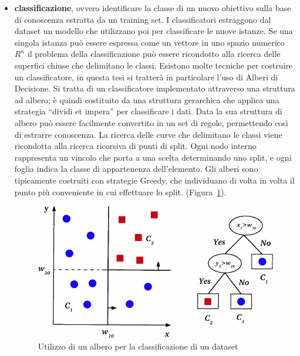\begin{itemize}
\item \textbf{classificazione}, ovvero identificare la classe di un nuovo obiettivo sulla base di conoscenza estratta da un training set. I classificatori estraggono dal dataset un modello che utilizzano poi per classificare le nuove istanze. Se una singola istanza può essere espressa come un vettore in uno spazio numerico $R^n$ il problema della classificazione può essere ricondotto alla ricerca delle superfici chiuse che delimitano le classi. Esistono molte tecniche per costruire un classificatore, in questa tesi si tratterà in particolare l'uso di Alberi di Decisione. Si tratta di un classificatore implementato attraverso una struttura ad albero; è quindi costituito da una struttura gerarchica che applica una strategia “dividi et impera” per classificare i dati. Data la sua struttura di albero può essere facilmente convertito in un set di regole, permettendo così di estrarre conoscenza. La ricerca delle curve che delimitano le classi viene ricondotta alla ricerca ricorsiva di punti di split.
Ogni nodo interno rappresenta un vincolo che porta a una scelta determinando uno split, e ogni foglia indica la classe di appartenenza dell’elemento. Gli alberi sono tipicamente costruiti con strategie Greedy, che individuano di volta in volta il punto più conveniente in cui effettuare lo split. (Figura~\ref{fig:alberoastratto}).

\begin{figure}[!h]
	\centering
	\includegraphics[width=\columnwidth]{figures/AlberoAstratto.png}
	\caption{Utilizzo di un albero per la classificazione di un dataset \label{fig:alberoastratto}}
\end{figure} 


\end{itemize}
